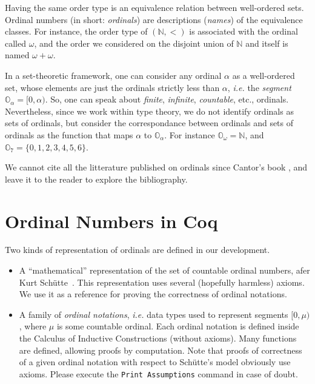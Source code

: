 Having the same order type is an equivalence relation between well-ordered sets. Ordinal numbers (in short: \emph{ordinals})  are descriptions (\emph{names}) of the equivalence classes.
For instance, the order type of $(\mathbb{N},<)$ is associated with the ordinal called  $\omega$, and the order we considered on 
the disjoint union of $\mathbb{N}$ and itself is named $\omega+\omega$.

In a set-theoretic framework, one can consider any ordinal $\alpha$ as a well-ordered set, whose  elements are just the ordinals strictly less than $\alpha$, \emph{i.e.} the \emph{segment} $\mathbb{O}_\alpha=[0, \alpha)$. So, one can speak about \emph{finite}, \emph{infinite}, \emph{countable}, etc., ordinals. Nevertheless, since we work within type theory, 
we do not identify ordinals as sets of ordinals, but consider the correspondance between ordinals and sets of ordinals as the function that maps $\alpha$ to $\mathbb{O}_\alpha$.
For instance $\mathbb{O}_\omega=\mathbb{N}$, and $\mathbb{O}_7=\{0,1,2,3,4,5,6\}$.


We cannot cite all the litterature published on ordinals since Cantor's book 
\cite{cantorbook}, and 
leave it to the reader to explore the bibliography. 


\section{Ordinal Numbers in Coq}

Two kinds of representation of ordinals are defined in our development.

\begin{itemize}
\item A ``mathematical'' representation of the set of countable ordinal numbers, afer Kurt Schütte~\cite{schutte}. This representation uses several (hopefully harmless) axioms. We use it as a reference for proving the correctness of ordinal notations.
\item A family of \emph{ordinal notations}, \emph{i.e.} data types used to represent segments $[0,\mu)$, where $\mu$ is some countable ordinal. Each ordinal notation is defined inside the Calculus of Inductive Constructions (without axioms). Many functions are defined, allowing proofs by computation. Note that proofs of 
correctness of a given ordinal notation with respect to Schütte's model obviously use axioms.
Please execute the \texttt{Print Assumptions} command in case of doubt.
\end{itemize}

